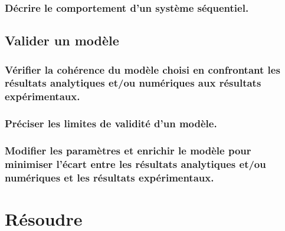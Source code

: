 \documentclass[10pt,fleqn]{book}
\newcommand{\repRel}{../..}
\newcommand{\repStyle}{\repRel/Style}
\newcommand{\td}{fichier_td}
\newcommand{\repExos}{\repRel/ExercicesCompetences}
\newcommand{\repExo}{dossier}
\begin{document}
\subsection{Décrire le comportement d'un système séquentiel.} 

\begin{multicols}{2} 

\renewcommand{\repExo}{\repExos/B2_ProposerModele/B2_17_Sequentiel/50_BancBalafre}
\renewcommand{\td}{50_BancBalafre}
\graphicspath{{\repStyle/png/}{\repExo/images/}}


\end{multicols}

\section{Valider un modèle} 

\subsection{Vérifier la cohérence du modèle choisi en confrontant les résultats analytiques et/ou numériques aux résultats expérimentaux.} 

\begin{multicols}{2} 

\end{multicols}

\subsection{Préciser les limites de validité d'un modèle.} 

\begin{multicols}{2} 

\end{multicols}

\subsection{Modifier les paramètres et enrichir le modèle pour minimiser l’écart entre les résultats analytiques et/ou numériques et les résultats expérimentaux.} 

\begin{multicols}{2} 

\end{multicols}

\chapter{Résoudre} 
\end{document}
